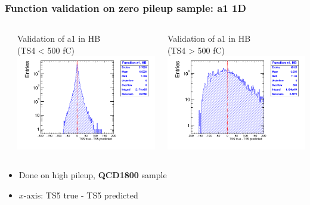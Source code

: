 \documentclass[bigger]{beamer}
\providecommand{\alert}[1]{\textbf{#1}}
\begin{document}
\begin{frame}
\frametitle{Function validation on zero pileup sample: a1 1D}
\label{sec-3-2-9}
\begin{columns} %
\label{sec-3-2-9-1}
\begin{column}{0.55\textwidth}
\label{sec-3-2-9-1-1}

\centering
Validation of a1 in HB \\ (TS4 < 500 fC)
\includegraphics[width=\textwidth]{fig/crosscheck_1D_sample1800_a1_under500_ring0.png}
\end{column}
\begin{column}{0.55\textwidth}
\label{sec-3-2-9-1-2}

\centering
Validation of a1 in HB \\ (TS4 > 500 fC)
\includegraphics[width=\textwidth]{fig/crosscheck_1D_sample1800_a1_over500_ring0.png}
\end{column}
\end{columns}
\label{sec-3-2-9-2}
\begin{itemize}

\item Done on high pileup, \alert{QCD1800} sample
\label{sec-3-2-9-2-1}%

\item $x$-axis: TS5 true - TS5 predicted
\label{sec-3-2-9-2-2}%
\end{itemize} %
\end{frame}
\end{document}
